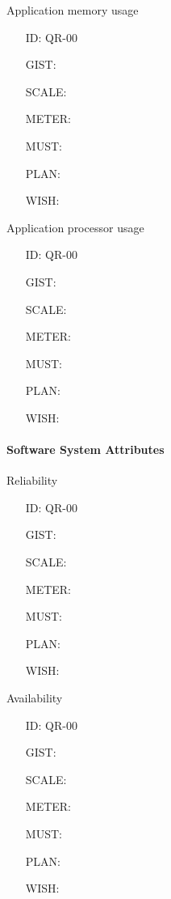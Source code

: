         Application memory usage

        \begin{itemize}
          \setlength{\itemindent}{.5in}
          \itemsep .15em
          \item[ID:] QR-00
          \item[GIST:]
          \item[SCALE:]
          \item[METER:]
          \item[MUST:]
          \item[PLAN:]
          \item[WISH:]
        \end{itemize}

        Application processor usage

        \begin{itemize}
          \setlength{\itemindent}{.5in}
          \itemsep .15em
          \item[ID:] QR-00
          \item[GIST:]
          \item[SCALE:]
          \item[METER:]
          \item[MUST:]
          \item[PLAN:]
          \item[WISH:]
        \end{itemize}

      \paragraph{Software System Attributes}

        Reliability

        \begin{itemize}
          \setlength{\itemindent}{.5in}
          \itemsep .15em
          \item[ID:] QR-00
          \item[GIST:]
          \item[SCALE:]
          \item[METER:]
          \item[MUST:]
          \item[PLAN:]
          \item[WISH:]
        \end{itemize}

        Availability

        \begin{itemize}
          \setlength{\itemindent}{.5in}
          \itemsep .15em
          \item[ID:] QR-00
          \item[GIST:]
          \item[SCALE:]
          \item[METER:]
          \item[MUST:]
          \item[PLAN:]
          \item[WISH:]
        \end{itemize}

